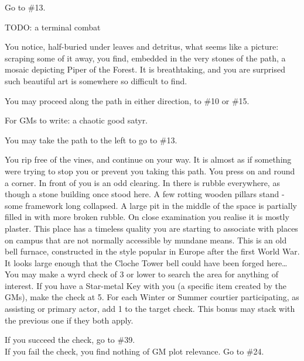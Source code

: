 \documentclass[green]{gl2018}
\begin{document}
\begin{large}
\begin{location}{30}
\begin{fromhere}Go to \#13.\end{fromhere}
\end{location}
\begin{location}{31}
TODO: a terminal combat
\end{location}
\begin{location}{32}
You notice, half-buried under leaves and detritus, what seems like a picture: scraping some of it away, you find, embedded in the very stones of the path, a mosaic depicting Piper of the Forest.  It is breathtaking, and you are surprised such beautiful art is somewhere so difficult to find.
\begin{fromhere}
You may proceed along the path in either direction, to \#10 or \#15.
\end{fromhere}
\end{location}
\begin{location}{33}
For GMs to write: a chaotic good satyr.  
\begin{fromhere}You may take the path to the left to go to \#13.\end{fromhere}
\end{location}
\begin{location}{34}
You rip free of the vines, and continue on your way. It is almost as if something were trying to stop you or prevent you taking this path. You press on and round a corner. In front of you is an odd clearing. In there is rubble everywhere, as though a stone building once stood here. A few rotting wooden pillars stand - some framework long collapsed. A large pit in the middle of the space is partially filled in with more broken rubble. On close examination you realise it is mostly plaster. This place has a timeless quality you are starting to associate with places on campus that are not normally accessible by mundane means. This is an old bell furnace, constructed in the style popular in Europe after the first World War. It looks large enough that the Cloche Tower bell could have been forged here… You may make a wyrd check of 3 or lower to search the area for anything of interest. If you have a Star-metal Key with you (a specific item created by the GMs), make the check at 5. For each Winter or Summer courtier participating, as assisting or primary actor, add 1 to the target check. This bonus may stack with the previous one if they both apply. 
\begin{fromhere}
If you succeed the check, go to \#39.\\
 If you fail the check, you find nothing of GM plot relevance. Go to \#24.

\end{fromhere}
\end{location}
\end{large}
\end{document}

